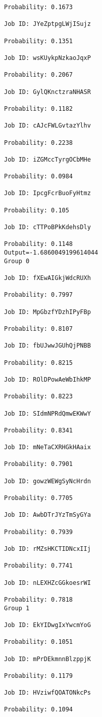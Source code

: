 \documentclass[11pt]{article}
\begin{document}
\begin{Verbatim}[commandchars=\\\{\}]
Probability: 0.1673

Job ID: JYeZptpgLWjISujz

Probability: 0.1351

Job ID: wsKUykpNzkaoJqxP

Probability: 0.2067

Job ID: GylQKnctzraNHASR

Probability: 0.1182

Job ID: cAJcFWLGvtazYlhv

Probability: 0.2238

Job ID: iZGMccTyrgOCbMHe

Probability: 0.0984

Job ID: IpcgFcrBuoFyHtmz

Probability: 0.105

Job ID: cTTPoBPkKdehsDly

Probability: 0.1148
Output=-1.6860049199614044
Group 0

Job ID: fXEwAIGkjWdcRUXh

Probability: 0.7997

Job ID: MpGbzfYDzhIPyFBp

Probability: 0.8107

Job ID: fbUJwwJGUhQjPNBB

Probability: 0.8215

Job ID: ROlDPowAeWbIhkMP

Probability: 0.8223

Job ID: SIdmNPRdQmwEKWwY

Probability: 0.8341

Job ID: mNeTaCXRHGkHAaix

Probability: 0.7901

Job ID: gowzWEWgSyNcHrdn

Probability: 0.7705

Job ID: AwbDTrJYzTmSyGYa

Probability: 0.7939

Job ID: rMZsHKCTIDNcxIIj

Probability: 0.7741

Job ID: nLEXHZcGGkoesrWI

Probability: 0.7818
Group 1

Job ID: EkYIDwgIxYwcmYoG

Probability: 0.1051

Job ID: mPrDEkmnnBlzppjK

Probability: 0.1179

Job ID: HVziwfQOATONkcPs

Probability: 0.1094


\end{Verbatim}
\end{document}
